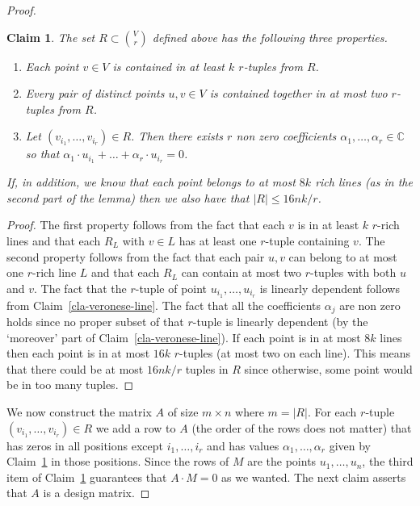 \documentclass[11pt]{article}
\newtheorem{claim}[thm]{Claim}
\def\C{{\mathbb{C}}}
\begin{document}
\begin{proof}
\begin{claim}\label{cla-rtuples}
The set $R \subset {V \choose r}$ defined above has the following three properties.
\begin{enumerate}
	\item Each point $v \in V$ is contained in at least $k$ $r$-tuples from $R$.
	\item Every pair of distinct points $u,v \in V$ is contained together in at most two $r$-tuples from $R$.
	\item Let $(v_{i_1},\ldots,v_{i_r}) \in R$. Then there exists $r$ non zero coefficients $\alpha_1,\ldots,\alpha_{r} \in \C$ so that $ \alpha_1 \cdot u_{i_1} + \ldots + \alpha_r \cdot u_{i_r} = 0$.
 \end{enumerate}
If, in addition, we know that each point belongs to at most $8k$ rich lines (as in the second part of the lemma) then we also have that  $|R|\le 16nk/r$.
\end{claim}
\begin{proof}
The first property follows from the fact that each $v$ is in at least $k$ $r$-rich lines and that each $R_L$ with $v \in L$ has at least  one $r$-tuple containing $v$. The second property follows from the fact that each pair $u,v$ can belong to at most one $r$-rich line $L$ and that each $R_L$ can contain at most two $r$-tuples with both $u$ and $v$. The fact that the $r$-tuple of point $u_{i_1},\ldots,u_{i_r}$ is linearly dependent follows from  Claim~\ref{cla-veronese-line}. The fact that all the coefficients $\alpha_j$ are non zero holds since no proper subset of that $r$-tuple is linearly  dependent (by the `moreover' part of Claim~\ref{cla-veronese-line}). If each point is in at most $8k$ lines then each point is in at most $16k$ $r$-tuples (at most two on each line). This means  that there could be at most $16nk/r$ tuples in $R$ since otherwise, some point would be in too many tuples.
\end{proof}
 
We now construct the matrix $A$ of size $m\times n$ where $m=|R|$. For each $r$-tuple $(v_{i_1},\ldots,v_{i_r}) \in R$ we add a row to $A$  (the order of the rows does not matter) that has zeros in all positions except $i_1,\ldots,i_r$ and has values $\alpha_1,\ldots, \alpha_r$ given by Claim~\ref{cla-rtuples} in those positions. Since the rows of $M$ are the points $u_1,\ldots,u_n$, the third item of Claim~\ref{cla-rtuples} guarantees that $A \cdot M = 0$ as we wanted. The next claim asserts that $A$ is a design matrix.


\end{proof}
\end{document}
